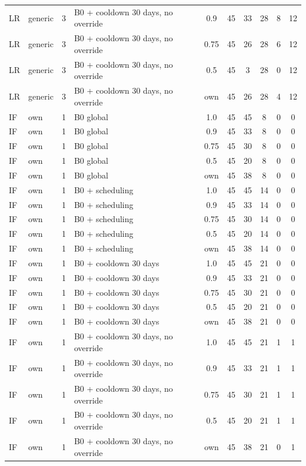 \begin{longtable}{lllp{4.4cm}cccccc}
LR & generic & 3 & B0 + cooldown 30 days, no override & 0.9 & 45 & 33 & 28 & 8 & 12 \\
LR & generic & 3 & B0 + cooldown 30 days, no override & 0.75 & 45 & 26 & 28 & 6 & 12 \\
LR & generic & 3 & B0 + cooldown 30 days, no override & 0.5 & 45 & 3 & 28 & 0 & 12 \\
LR & generic & 3 & B0 + cooldown 30 days, no override & own & 45 & 26 & 28 & 4 & 12 \\
IF & own & 1 & B0 global & 1.0 & 45 & 45 & 8 & 0 & 0 \\
IF & own & 1 & B0 global & 0.9 & 45 & 33 & 8 & 0 & 0 \\
IF & own & 1 & B0 global & 0.75 & 45 & 30 & 8 & 0 & 0 \\
IF & own & 1 & B0 global & 0.5 & 45 & 20 & 8 & 0 & 0 \\
IF & own & 1 & B0 global & own & 45 & 38 & 8 & 0 & 0 \\
IF & own & 1 & B0 + scheduling & 1.0 & 45 & 45 & 14 & 0 & 0 \\
IF & own & 1 & B0 + scheduling & 0.9 & 45 & 33 & 14 & 0 & 0 \\
IF & own & 1 & B0 + scheduling & 0.75 & 45 & 30 & 14 & 0 & 0 \\
IF & own & 1 & B0 + scheduling & 0.5 & 45 & 20 & 14 & 0 & 0 \\
IF & own & 1 & B0 + scheduling & own & 45 & 38 & 14 & 0 & 0 \\
IF & own & 1 & B0 + cooldown 30 days & 1.0 & 45 & 45 & 21 & 0 & 0 \\
IF & own & 1 & B0 + cooldown 30 days & 0.9 & 45 & 33 & 21 & 0 & 0 \\
IF & own & 1 & B0 + cooldown 30 days & 0.75 & 45 & 30 & 21 & 0 & 0 \\
IF & own & 1 & B0 + cooldown 30 days & 0.5 & 45 & 20 & 21 & 0 & 0 \\
IF & own & 1 & B0 + cooldown 30 days & own & 45 & 38 & 21 & 0 & 0 \\
IF & own & 1 & B0 + cooldown 30 days, no override & 1.0 & 45 & 45 & 21 & 1 & 1 \\
IF & own & 1 & B0 + cooldown 30 days, no override & 0.9 & 45 & 33 & 21 & 1 & 1 \\
IF & own & 1 & B0 + cooldown 30 days, no override & 0.75 & 45 & 30 & 21 & 1 & 1 \\
IF & own & 1 & B0 + cooldown 30 days, no override & 0.5 & 45 & 20 & 21 & 1 & 1 \\
IF & own & 1 & B0 + cooldown 30 days, no override & own & 45 & 38 & 21 & 0 & 1 \\

\end{longtable}
